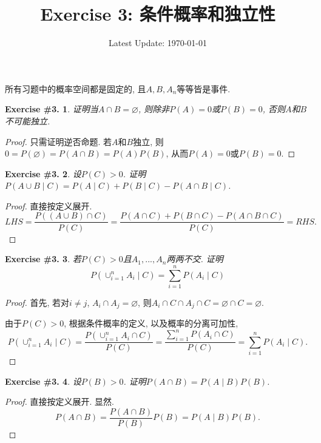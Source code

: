 \documentclass[UTF8, a4paper]{article}
\title{Exercise 3: 条件概率和独立性}
\author{}
\date{Latest Update: \today}
\newtheorem{exercise}{Exercise \#3.}
\begin{document}
\maketitle

所有习题中的概率空间都是固定的, 且\(A, B, A_n\)等等皆是事件.

\begin{framed}
\begin{exercise}
    证明当\(A \cap B = \varnothing\), 则除非\(P(A) = 0\)或\(P(B) = 0\), 否则\(A\)和\(B\)不可能独立.
\end{exercise}
\end{framed}

\begin{proof}
    只需证明逆否命题. 若\(A\)和\(B\)独立, 则\(0=P(\varnothing) = P(A \cap B) = P(A)P(B)\), 从而\(P(A) = 0\)或\(P(B) = 0\).
\end{proof}

\begin{framed}
\begin{exercise}
    设\(P(C) > 0\). 证明\(P(A\cup B \mid C) = P(A \mid C) + P(B \mid C) - P(A \cap B \mid C)\).
\end{exercise}
\end{framed}

\begin{proof}
直接按定义展开.
$$
LHS = \frac{P((A\cup B) \cap C)}{P(C)} = \frac{P(A \cap C) + P(B \cap C) - P(A \cap B \cap C)}{P(C)} = RHS.
$$
\end{proof}


\begin{framed}
\begin{exercise}
    若\(P(C) > 0\)且\(A_1, ..., A_n\)两两不交. 证明
$$
P\left(\cup_{i=1}^n A_i \mid C\right)=\sum_{i=1}^n P\left(A_i \mid C\right)
$$
\end{exercise}
\end{framed}
\begin{proof}
首先, 若对\(i\neq j\), \(A_i \cap A_j = \varnothing\), 则\(A_i \cap C\cap A_j \cap C = \varnothing \cap C = \varnothing\). 

由于\(P(C) > 0 \), 根据条件概率的定义, 以及概率的分离可加性, 
$$
P\left(\cup_{i=1}^n A_i \mid C\right) = \frac{P\left(\cup_{i=1}^n A_i \cap C\right)}{P(C)} = \frac{\sum_{i=1}^n P(A_i \cap C)}{P(C)} = \sum_{i=1}^n P(A_i \mid C).
$$ 
\end{proof}


\begin{framed}
\begin{exercise}
    设\(P(B) > 0\). 证明\(P(A \cap B) = P(A \mid B) P(B)\).
\end{exercise}
\end{framed}
\begin{proof}
直接按定义展开. 显然.
$$
P(A \cap B) = \frac{P(A \cap B)}{P(B)}P(B) = P(A \mid B)P(B).
$$
\end{proof}
\end{document}
